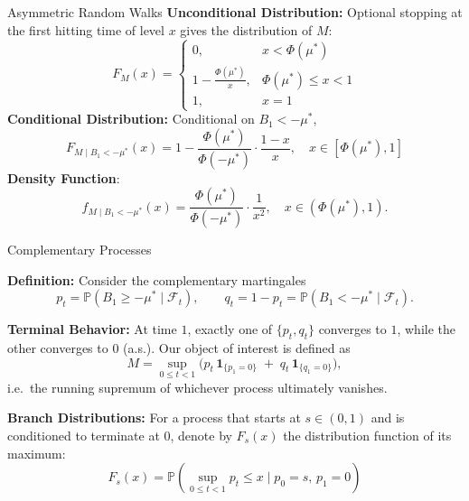 \documentclass[final]{beamer}
\newlength{\colwidth}
\begin{document}
\begin{frame}[t]
\begin{columns}[t]
\begin{column}{\colwidth}
\begin{block}{Asymmetric Random Walks}
    \textbf{Unconditional Distribution:} Optional stopping at the first hitting time of level $x$ gives the distribution of $M$:
    \begin{equation*}
        F_M(x) = 
        \begin{cases}
            0, & x < \Phi(\mu^*) \\[6pt]
            1 - \tfrac{\Phi(\mu^*)}{x}, & \Phi(\mu^*) \le x < 1 \\[6pt]
            1, & x = 1
        \end{cases}
    \end{equation*}
    \textbf{Conditional Distribution:} Conditional on $B_1< -\mu^*$,
    \begin{equation*}
      F_{M \mid B_1 < -\mu^*}(x) = 1 - \dfrac{\Phi(\mu^*)}{\Phi(-\mu^*)}\cdot\dfrac{1-x}{x}, \quad x \in [\Phi(\mu^*),1]
    \end{equation*}
    \textbf{Density Function}:
    \begin{equation*}
      f_{M \mid B_1 < -\mu^*}(x) = \frac{\Phi(\mu^*)}{\Phi(-\mu^*)}\cdot\frac{1}{x^2},
      \quad x \in (\Phi(\mu^*),1).
    \end{equation*}
  \end{block}

  \begin{block}{Complementary Processes}

    \textbf{Definition:} Consider the complementary martingales
    \begin{equation*}
      p_t = \mathbb{P}(B_1 \ge -\mu^* \mid \mathcal F_t),
      \qquad q_t = 1-p_t = \mathbb{P}(B_1 < -\mu^* \mid \mathcal F_t).
    \end{equation*}

    \textbf{Terminal Behavior:} At time $1$, exactly one of $\{p_t,q_t\}$ converges to $1$, while the other converges to $0$ (a.s.). Our object of interest is defined as
    \begin{equation*}
      M = \sup_{0 \le t < 1} \big( p_t \,\mathbf 1_{\{p_1=0\}} \;+\; q_t \,\mathbf 1_{\{q_1=0\}} \big),
    \end{equation*}
    i.e.\ the running supremum of whichever process ultimately vanishes.

    \textbf{Branch Distributions:} For a process that starts at $s \in (0,1)$ and is conditioned to terminate at $0$, denote by $F_s(x)$ the distribution function of its maximum:
    \begin{equation*}
      F_s(x) = \mathbb{P}(\sup_{0\le t<1} p_t \le x \mid p_0=s,\,p_1=0)
    \end{equation*}


\end{block}
\end{column}
\end{columns}
\end{frame}
\end{document}
